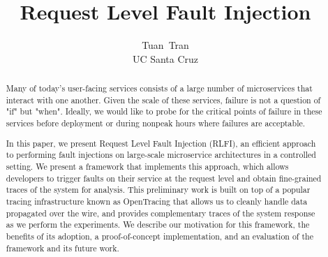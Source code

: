 \documentclass[letterpaper,twocolumn,10pt]{article}
\begin{document}
\date{}

\title{\Large \bf Request Level Fault Injection}

\author{
{\rm Tuan\ Tran}\\
UC Santa Cruz
}

\maketitle


\begin{abstract}
Many of today's user-facing services consists of a large number of microservices that interact with one another.
Given the scale of these services, failure is not a question of "if" but "when". Ideally, we would like to probe for
the critical points of failure in these services before deployment or during nonpeak hours where failures are acceptable.

In this paper, we present Request Level Fault Injection (RLFI), an efficient approach to performing fault injections on large-scale microservice architectures in a controlled setting. We present a framework that implements this approach, which allows developers to trigger faults on their service at the request level and obtain fine-grained traces of the system for analysis. This preliminary work is built on top of a popular tracing infrastructure known as OpenTracing\cite{opentracing:doc} that allows us to cleanly handle data propagated over the wire, and provides complementary traces of the system response as we perform the experiments. We describe our motivation for this framework, the benefits of its adoption, a proof-of-concept implementation, and an evaluation of the framework and its future work.
\end{abstract}
\end{document}

